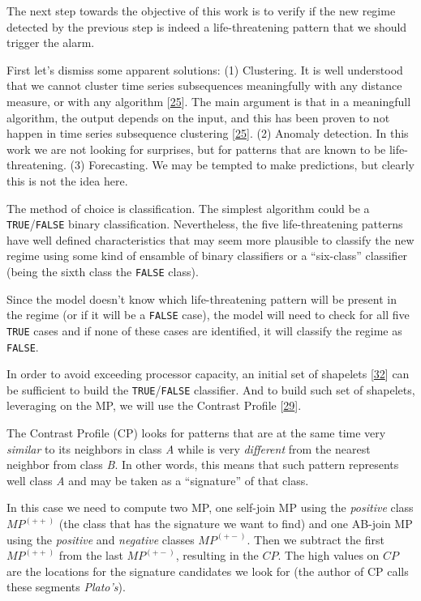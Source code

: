 \documentclass[runningheads]{llncs}
\begin{document}
The next step towards the objective of this work is to verify if the new regime detected by the
previous step is indeed a life-threatening pattern that we should trigger the alarm.

First let's dismiss some apparent solutions: (1) Clustering. It is well understood that we cannot
cluster time series subsequences meaningfully with any distance measure, or with any algorithm
{[}\protect\hyperlink{ref-Keogh2005}{25}{]}. The main argument is that in a meaningfull algorithm, the output depends on the input,
and this has been proven to not happen in time series subsequence clustering {[}\protect\hyperlink{ref-Keogh2005}{25}{]}. (2)
Anomaly detection. In this work we are not looking for surprises, but for patterns that are known to
be life-threatening. (3) Forecasting. We may be tempted to make predictions, but clearly this is not
the idea here.

The method of choice is classification. The simplest algorithm could be a \texttt{TRUE}/\texttt{FALSE} binary
classification. Nevertheless, the five life-threatening patterns have well defined characteristics
that may seem more plausible to classify the new regime using some kind of ensamble of binary
classifiers or a ``six-class'' classifier (being the sixth class the \texttt{FALSE} class).

Since the model doesn't know which life-threatening pattern will be present in the regime (or if it
will be a \texttt{FALSE} case), the model will need to check for all five \texttt{TRUE} cases and if none of these
cases are identified, it will classify the regime as \texttt{FALSE}.

In order to avoid exceeding processor capacity, an initial set of shapelets {[}\protect\hyperlink{ref-Rakthanmanon2013}{32}{]} can
be sufficient to build the \texttt{TRUE}/\texttt{FALSE} classifier. And to build such set of shapelets, leveraging
on the MP, we will use the Contrast Profile {[}\protect\hyperlink{ref-Mercer2021}{29}{]}.

The Contrast Profile (CP) looks for patterns that are at the same time very \emph{similar} to its
neighbors in class \emph{A} while is very \emph{different} from the nearest neighbor from class \emph{B}. In other
words, this means that such pattern represents well class \emph{A} and may be taken as a ``signature'' of
that class.

In this case we need to compute two MP, one self-join MP using the \emph{positive} class \(MP^{(++)}\) (the
class that has the signature we want to find) and one AB-join MP using the \emph{positive} and \emph{negative}
classes \(MP^{(+-)}\). Then we subtract the first \(MP^{(++)}\) from the last \(MP^{(+-)}\), resulting in
the \(CP\). The high values on \(CP\) are the locations for the signature candidates we look for (the
author of CP calls these segments \emph{Plato's}).
\end{document}
